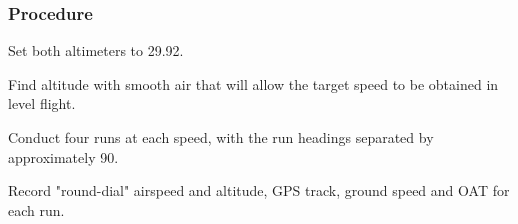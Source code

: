 % 
% 
%
 \subsubsection*{Procedure}
 \begin{compactenum}
   \item Set both altimeters to 29.92.
   \item Find altitude with smooth air that will allow the target speed to be obtained in level flight.
   \item Conduct four runs at each speed, with the run headings separated by approximately 90\textdegree.
   \item Record "round-dial" airspeed and altitude, GPS track, ground speed and OAT for each run.
   \end{compactenum}
